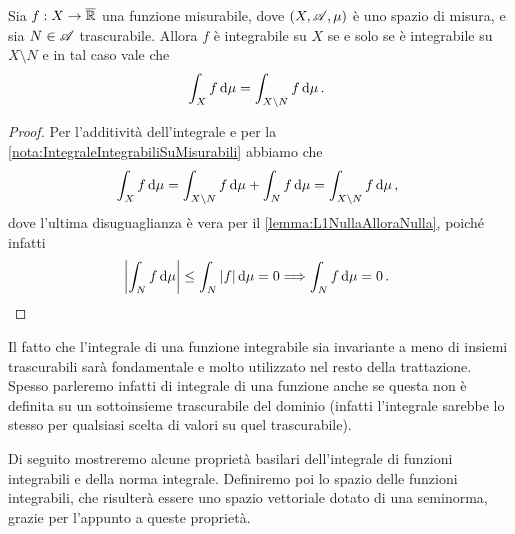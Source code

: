 \begin{corollary}\label{cor:IntegraleAMenoDiTrascurabili}
	Sia $f:X\to\overline{\mathbb R}$ una funzione misurabile, dove $(X,\mathscr A,\mu)$ è uno spazio di misura, e sia $N\in\mathscr A$ trascurabile. Allora $f$ è integrabile su $X$ se e solo se è integrabile su $X\setminus N$ e in tal caso vale che
	\begin{equation*}
		\int_X f\,\mathrm d\mu=\int_{X\setminus N}f\,\mathrm d\mu\, \text{. }
	\end{equation*}
\end{corollary}
\begin{proof}
	Per l'additività dell'integrale e per la \cref{nota:IntegraleIntegrabiliSuMisurabili} abbiamo che
	\begin{equation*}
		\int_X f\,\mathrm d\mu=\int_{X\setminus N} f \,\mathrm d\mu+\int_N f\,\mathrm d\mu=\int_{X\setminus N}f\,\mathrm d\mu\, \text{, }
	\end{equation*}
	dove l'ultima disuguaglianza è vera per il \cref{lemma:L1NullaAlloraNulla}, poiché infatti
	\begin{equation*}
		\left|\int_N f\,\mathrm d\mu\right|\le \int_N |f|\,\mathrm d\mu=0 \Longrightarrow \int_N f\,\mathrm d\mu=0\, \text{. }
	\end{equation*}
\end{proof}


Il fatto che l'integrale di una funzione integrabile sia invariante a meno di insiemi trascurabili sarà fondamentale e molto utilizzato nel resto della trattazione. Spesso parleremo infatti di integrale di una funzione anche se questa non è definita su un sottoinsieme trascurabile del dominio (infatti l'integrale sarebbe lo stesso per qualsiasi scelta di valori su quel trascurabile).

Di seguito mostreremo alcune proprietà basilari dell'integrale di funzioni integrabili e della norma integrale. Definiremo poi lo spazio delle funzioni integrabili, che risulterà essere uno spazio vettoriale dotato di una seminorma, grazie per l'appunto a queste proprietà.

